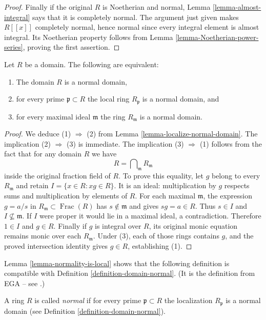 \begin{proof}
Finally if the original $R$ is Noetherian and normal, Lemma
\ref{lemma-almost-integral} says that it is completely normal.
The argument just given makes $R[[x]]$ completely normal, hence
normal since every integral element is almost integral.
Its Noetherian property follows from
Lemma \ref{lemma-Noetherian-power-series}, proving the first assertion.
\end{proof}

\begin{lemma}
\label{lemma-normality-is-local}
Let $R$ be a domain. The following are equivalent:
\begin{enumerate}
\item The domain $R$ is a normal domain,
\item for every prime $\mathfrak p \subset R$ the local ring
$R_{\mathfrak p}$ is a normal domain, and
\item for every maximal ideal $\mathfrak m$ the ring $R_{\mathfrak m}$
is a normal domain.
\end{enumerate}
\end{lemma}

\begin{proof}
We deduce (1) $\Rightarrow$ (2) from Lemma \ref{lemma-localize-normal-domain}.
The implication (2) $\Rightarrow$ (3) is immediate. The implication
(3) $\Rightarrow$ (1) follows from the fact that for any domain $R$ we have
$$
R = \bigcap\nolimits_{\mathfrak m} R_{\mathfrak m}
$$
inside the original fraction field of $R$. To prove this equality,
let $g$ belong to every $R_{\mathfrak m}$ and retain
$I=\{x\in R:xg\in R\}$. It is an ideal: multiplication by
$g$ respects sums and multiplication by elements of $R$.
For each maximal $\mathfrak m$, the expression $g=a/s$ in
$R_{\mathfrak m}\subset\operatorname{Frac}(R)$ has
$s\notin\mathfrak m$ and gives $sg=a\in R$. Thus $s\in I$
and $I\not\subseteq\mathfrak m$. If $I$ were proper it would
lie in a maximal ideal, a contradiction. Therefore $1\in I$
and $g\in R$. Finally if $g$ is integral over $R$, its original
monic equation remains monic over each $R_{\mathfrak m}$.
Under (3), each of those rings contains $g$, and the proved
intersection identity gives $g\in R$, establishing (1).
\end{proof}

\noindent
Lemma \ref{lemma-normality-is-local} shows that the following definition
is compatible with Definition \ref{definition-domain-normal}. (It is the
definition from EGA -- see \cite[IV, 5.13.5 and 0, 4.1.4]{EGA}.)

\begin{definition}
\label{definition-ring-normal}
A ring $R$ is called {\it normal} if for every prime
$\mathfrak p \subset R$ the localization $R_{\mathfrak p}$ is
a normal domain (see Definition \ref{definition-domain-normal}).
\end{definition}

